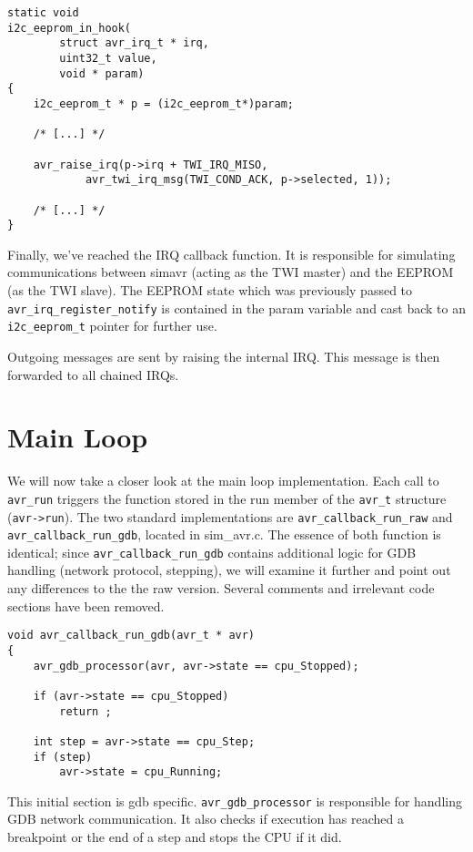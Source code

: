 \begin{lstlisting}
static void
i2c_eeprom_in_hook(
		struct avr_irq_t * irq,
		uint32_t value,
		void * param)
{
	i2c_eeprom_t * p = (i2c_eeprom_t*)param;

    /* [...] */

    avr_raise_irq(p->irq + TWI_IRQ_MISO,
            avr_twi_irq_msg(TWI_COND_ACK, p->selected, 1));

    /* [...] */
}
\end{lstlisting}

Finally, we've reached the IRQ callback function. It is responsible for
simulating communications between simavr (acting as the TWI master) and the
EEPROM (as the TWI slave). The EEPROM state which was previously passed to
\lstinline|avr_irq_register_notify| is contained in the param variable and cast back to
an \lstinline|i2c_eeprom_t| pointer for further use.

Outgoing messages are sent by raising the internal IRQ. This message is then
forwarded to all chained IRQs.

\section{Main Loop}

We will now take a closer look at the main loop implementation. Each call to
\lstinline|avr_run| triggers the function stored in the run member of the \lstinline|avr_t| structure
(\lstinline|avr->run|). The two standard implementations are \lstinline|avr_callback_run_raw| and
\lstinline|avr_callback_run_gdb|, located in sim\_avr.c. The essence of both function is
identical; since \lstinline|avr_callback_run_gdb| contains additional logic for GDB
handling (network protocol, stepping), we will examine it further and point out
any differences to the the raw version. Several comments and irrelevant code
sections have been removed.

\begin{lstlisting}
void avr_callback_run_gdb(avr_t * avr)
{
    avr_gdb_processor(avr, avr->state == cpu_Stopped);

    if (avr->state == cpu_Stopped)
        return ;

    int step = avr->state == cpu_Step;
    if (step)
        avr->state = cpu_Running;
\end{lstlisting}

This initial section is gdb specific. \lstinline|avr_gdb_processor| is responsible for
handling GDB network communication. It also checks if execution has reached a
breakpoint or the end of a step and stops the CPU if it did.

